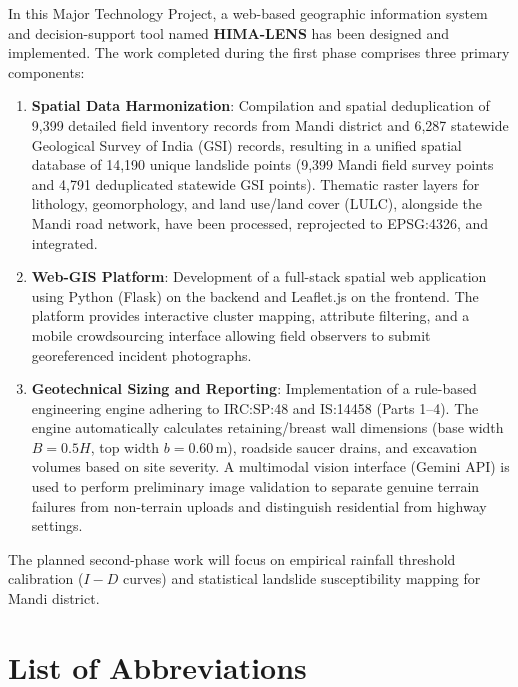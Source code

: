 \documentclass[12pt,a4paper]{report}
\begin{document}
In this Major Technology Project, a web-based geographic information system and decision-support tool named \textbf{HIMA-LENS} has been designed and implemented. The work completed during the first phase comprises three primary components:
\begin{enumerate}[noitemsep]
    \item \textbf{Spatial Data Harmonization}: Compilation and spatial deduplication of 9,399 detailed field inventory records from Mandi district and 6,287 statewide Geological Survey of India (GSI) records, resulting in a unified spatial database of 14,190 unique landslide points (9,399 Mandi field survey points and 4,791 deduplicated statewide GSI points). Thematic raster layers for lithology, geomorphology, and land use/land cover (LULC), alongside the Mandi road network, have been processed, reprojected to EPSG:4326, and integrated.
    \item \textbf{Web-GIS Platform}: Development of a full-stack spatial web application using Python (Flask) on the backend and Leaflet.js on the frontend. The platform provides interactive cluster mapping, attribute filtering, and a mobile crowdsourcing interface allowing field observers to submit georeferenced incident photographs.
    \item \textbf{Geotechnical Sizing and Reporting}: Implementation of a rule-based engineering engine adhering to IRC:SP:48 and IS:14458 (Parts 1--4). The engine automatically calculates retaining/breast wall dimensions (base width $B=0.5H$, top width $b=0.60\,\text{m}$), roadside saucer drains, and excavation volumes based on site severity. A multimodal vision interface (Gemini API) is used to perform preliminary image validation to separate genuine terrain failures from non-terrain uploads and distinguish residential from highway settings.
\end{enumerate}

The planned second-phase work will focus on empirical rainfall threshold calibration ($I-D$ curves) and statistical landslide susceptibility mapping for Mandi district.

\newpage

\tableofcontents
\listoffigures
\listoftables

\chapter*{List of Abbreviations}
\end{document}
